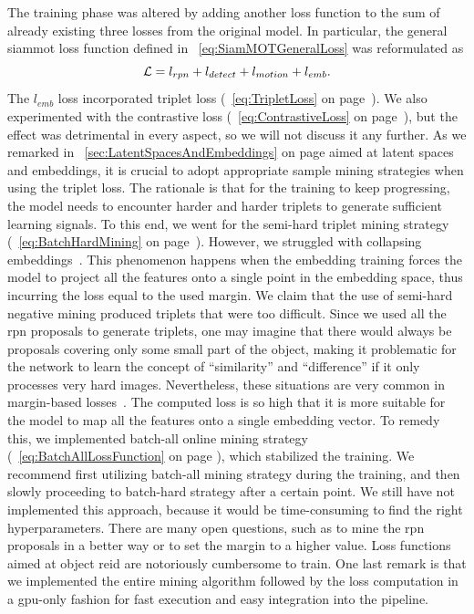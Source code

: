 The training phase was altered by adding another loss function to the sum of already existing three losses from the original model. In particular, the general \gls{siammot} loss function defined in \eqtext{}~\ref{eq:SiamMOTGeneralLoss} was reformulated as
\begin{equation}
    \label{eq:SiamMOTFeatureEmbLoss}
    \mathcal{L} = l_{rpn} + l_{detect} + l_{motion} + l_{emb}.
\end{equation}
The $l_{emb}$ loss incorporated triplet loss (\eqtext{}~\ref{eq:TripletLoss} on page~\pageref{eq:TripletLoss}). We also experimented with the contrastive loss (\eqtext{}~\ref{eq:ContrastiveLoss} on page~\pageref{eq:ContrastiveLoss}), but the effect was detrimental in every aspect, so we will not discuss it any further. As we remarked in \sectiontext{}~\ref{sec:LatentSpacesAndEmbeddings} on page \pageref{sec:LatentSpacesAndEmbeddings} aimed at latent spaces and embeddings, it is crucial to adopt appropriate sample mining strategies when using the triplet loss. The rationale is that for the training to keep progressing, the model needs to encounter harder and harder triplets to generate sufficient learning signals. To this end, we went for the semi-hard triplet mining strategy (\eqtext{}~\ref{eq:BatchHardMining} on page~\pageref{eq:BatchHardMining}). However, we struggled with collapsing embeddings~\cite{levi2021rethinking}. This phenomenon happens when the embedding training forces the model to project all the features onto a single point in the embedding space, thus incurring the loss equal to the used margin. We claim that the use of semi-hard negative mining produced triplets that were too difficult. Since we used all the \gls{rpn} proposals to generate triplets, one may imagine that there would always be proposals covering only some small part of the object, making it problematic for the network to learn the concept of ``similarity'' and ``difference'' if it only processes very hard images. Nevertheless, these situations are very common in margin-based losses~\cite{levi2021rethinking}. The computed loss is so high that it is more suitable for the model to map all the features onto a single embedding vector. To remedy this, we implemented batch-all online mining strategy (\eqtext{}~\ref{eq:BatchAllLossFunction} on page \pageref{eq:BatchAllLossFunction}), which stabilized the training. We recommend first utilizing batch-all mining strategy during the training, and then slowly proceeding to batch-hard strategy after a certain point. We still have not implemented this approach, because it would be time-consuming to find the right hyperparameters. There are many open questions, such as to mine the \gls{rpn} proposals in a better way or to set the margin to a higher value. Loss functions aimed at object \gls{reid} are notoriously cumbersome to train. One last remark is that we implemented the entire mining algorithm followed by the loss computation in a \gls{gpu}-only fashion for fast execution and easy integration into the pipeline.

